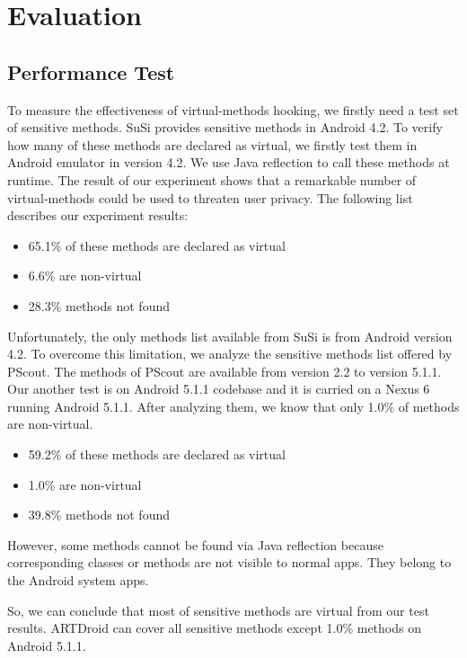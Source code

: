 \section{Evaluation}
\label{sec:eva}

\subsection{Performance Test}

To measure the effectiveness of virtual-methods hooking, we firstly need a test set of sensitive methods. SuSi\cite{rasthofer2014machine} provides sensitive methods in Android 4.2. To verify how many of these methods are declared as virtual,  we firstly test them in Android emulator in version 4.2. We use Java reflection to call these methods at runtime. The result of our experiment shows that a remarkable number of virtual-methods could be used to threaten user privacy. The following list describes our experiment results: 

\begin{itemize}
\item 65.1\% of these methods are declared as virtual
\item 6.6\% are non-virtual
\item 28.3\% methods not found
\end{itemize}


Unfortunately, the only methods list available from SuSi is from Android version 4.2. To overcome this limitation, we analyze the sensitive methods list offered by PScout\cite{au2012pscout}. The methods of PScout are available from version 2.2 to version 5.1.1. Our another test is on Android 5.1.1 codebase and it is carried on a Nexus 6 running Android 5.1.1. After analyzing them, we know that only 1.0\% of methods are non-virtual. 

\begin{itemize}
\item 59.2\% of these methods are declared as virtual
\item 1.0\% are non-virtual
\item 39.8\% methods not found
\end{itemize}

However, some methods cannot be found via Java reflection because corresponding classes or methods are not visible to normal apps. They belong to the Android system apps.

So, we can conclude that most of sensitive methods are virtual from our test results. ARTDroid can cover all sensitive methods except 1.0\% methods on Android 5.1.1.



